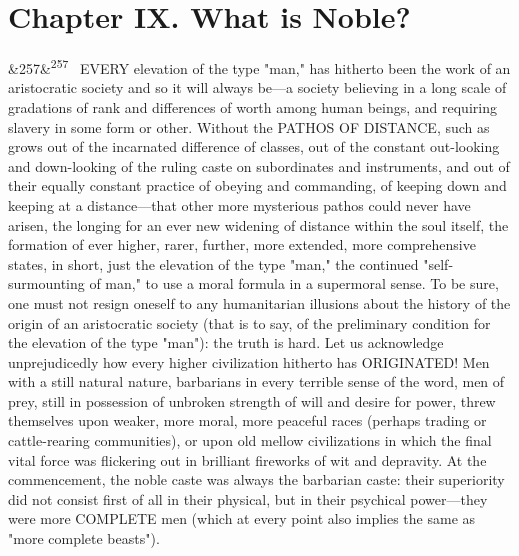 \documentclass[12pt]{article}
\newcommand{\para}[1][]{\par\noindent\ifx&#1&\else\textsuperscript{\footnotesize #1}~\fi}
\begin{document}
\section*{Chapter IX. What is Noble?}

\para[257] EVERY elevation of the type "man," has hitherto been the work of an aristocratic society and so it will always be---a society believing in a long scale of gradations of rank and differences of worth among human beings, and requiring slavery in some form or other. Without the PATHOS OF DISTANCE, such as grows out of the incarnated difference of classes, out of the constant out-looking and down-looking of the ruling caste on subordinates and instruments, and out of their equally constant practice of obeying and commanding, of keeping down and keeping at a distance---that other more mysterious pathos could never have arisen, the longing for an ever new widening of distance within the soul itself, the formation of ever higher, rarer, further, more extended, more comprehensive states, in short, just the elevation of the type "man," the continued "self-surmounting of man," to use a moral formula in a supermoral sense. To be sure, one must not resign oneself to any humanitarian illusions about the history of the origin of an aristocratic society (that is to say, of the preliminary condition for the elevation of the type "man"): the truth is hard. Let us acknowledge unprejudicedly how every higher civilization hitherto has ORIGINATED! Men with a still natural nature, barbarians in every terrible sense of the word, men of prey, still in possession of unbroken strength of will and desire for power, threw themselves upon weaker, more moral, more peaceful races (perhaps trading or cattle-rearing communities), or upon old mellow civilizations in which the final vital force was flickering out in brilliant fireworks of wit and depravity. At the commencement, the noble caste was always the barbarian caste: their superiority did not consist first of all in their physical, but in their psychical power---they were more COMPLETE men (which at every point also implies the same as "more complete beasts").
\end{document}
